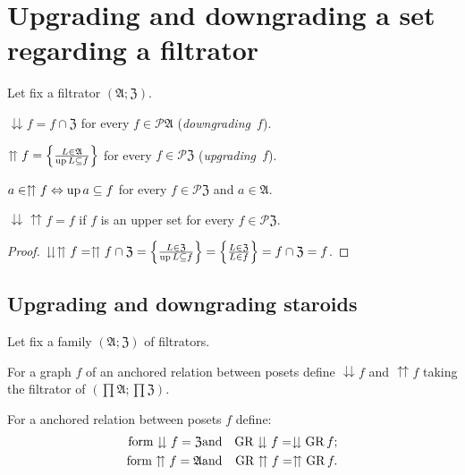 \section{Upgrading and downgrading a set regarding a filtrator}

Let fix a filtrator $(\mathfrak{A};\mathfrak{Z})$.
\begin{defn}
$\downdownarrows f=f\cap\mathfrak{Z}$ for every
$f\in\mathscr{P}\mathfrak{A}$ (\emph{downgrading~}$f$).
\end{defn}

\begin{defn}
$\upuparrows f=\left\{ \frac{L\in\mathfrak{A}}{\operatorname{up} L\subseteq f}\right\}$
for every $f\in\mathscr{P}\mathfrak{Z}$ (\emph{upgrading~}$f$).\end{defn}
\begin{obvious}
$a\in\upuparrows f\Leftrightarrow\operatorname{up} a\subseteq f$ for every $f\in\mathscr{P}\mathfrak{Z}$
and $a\in\mathfrak{A}$.\end{obvious}
\begin{prop}
\label{up-and-back}$\downdownarrows\upuparrows f=f$ if $f$ is an
upper set for every $f\in\mathscr{P}\mathfrak{Z}$.\end{prop}
\begin{proof}
$\downdownarrows\upuparrows f=\upuparrows f\cap\mathfrak{Z}=\left\{ \frac{L\in\mathfrak{Z}}{\operatorname{up} L\subseteq f}\right\}=\left\{ \frac{L\in\mathfrak{Z}}{L\in f}\right\}=f\cap\mathfrak{Z}=f$.
\end{proof}

\subsection{Upgrading
and downgrading staroids}

Let fix a family $(\mathfrak{A};\mathfrak{Z})$ of filtrators.

For a graph $f$ of an anchored relation between posets define $\downdownarrows f$
and $\upuparrows f$ taking the filtrator of $\left(\prod\mathfrak{A};\prod\mathfrak{Z}\right)$.

For a anchored relation between posets $f$ define:
\begin{eqnarray*}
\operatorname{form}\downdownarrows f=\mathfrak{Z} & \text{and} & \operatorname{GR}\downdownarrows f=\downdownarrows\operatorname{GR} f;\\
\operatorname{form}\upuparrows f=\mathfrak{A} & \text{and} & \operatorname{GR}\upuparrows f=\upuparrows\operatorname{GR} f.
\end{eqnarray*}


